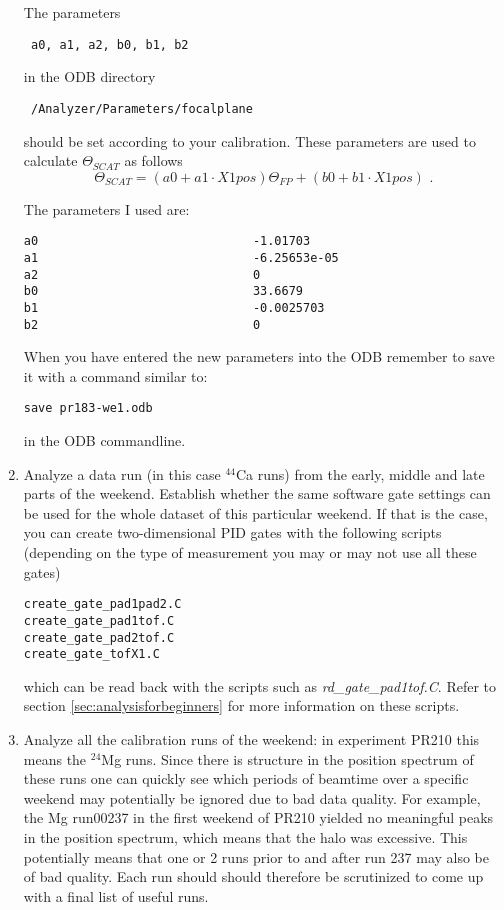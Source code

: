\documentclass[11pt]{report}
\begin{document}
\begin{enumerate}
The parameters
\begin{verbatim} a0, a1, a2, b0, b1, b2 \end{verbatim}
in the ODB directory
\begin{verbatim} /Analyzer/Parameters/focalplane  \end{verbatim}
should be set according to your calibration. These parameters are used
to calculate $\Theta_{SCAT}$ as follows
\begin{equation}
\Theta_{SCAT} = (a0+a1\cdot X1pos)\Theta_{FP} + (b0+b1\cdot X1pos)
\textrm{ .}  
\label{eq:thfp_to_thscat}
\end{equation} 

The parameters I used are:
\begin{verbatim}
a0                              -1.01703
a1                              -6.25653e-05
a2                              0
b0                              33.6679
b1                              -0.0025703
b2                              0
\end{verbatim}

When you have entered the new parameters into the ODB remember to save it with a command similar to:
\begin{verbatim}save pr183-we1.odb \end{verbatim}
in the ODB commandline.

\item Analyze a data run (in this case $^{44}$Ca runs) from the early, middle and late parts of the weekend.
Establish whether the same software gate settings can be used for the whole dataset of this particular weekend.
If that is the case, you can create two-dimensional PID gates with the following scripts
(depending on the type of measurement you may or may not use all these gates)
\begin{verbatim}
create_gate_pad1pad2.C
create_gate_pad1tof.C
create_gate_pad2tof.C
create_gate_tofX1.C
\end{verbatim}
which can be read back with the scripts such as {\it rd\_gate\_pad1tof.C}. 
Refer to section \ref{sec:analysisforbeginners} for more information on these scripts.

\item
Analyze all the calibration runs of the weekend: in experiment PR210 this means
the $^{24}$Mg runs. Since there is structure in the position spectrum of these runs
one can quickly see which periods of beamtime over a specific weekend 
may potentially be ignored due to bad data quality.
For example, the Mg run00237 in the first weekend of PR210 yielded no meaningful peaks 
in the position spectrum, which means that the halo was excessive. This potentially means
that one or 2 runs prior to and after run 237 may also be of bad quality. Each run should
should therefore be scrutinized to come up with a final list of useful runs.


\end{enumerate}
\end{document}
